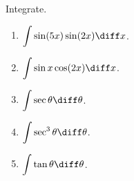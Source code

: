 Integrate.
\begin{enumerate}
\item $\displaystyle \int \sin (5 x) \sin (2x)\diff x$.
\item $\displaystyle \int \sin x \cos (2x)\diff x$.

\item $\displaystyle \int \sec \theta  \diff \theta$.
\item $\displaystyle \int \sec^3\theta \diff \theta$.
\item $\displaystyle \int \tan \theta \diff \theta$.

\end{enumerate}
